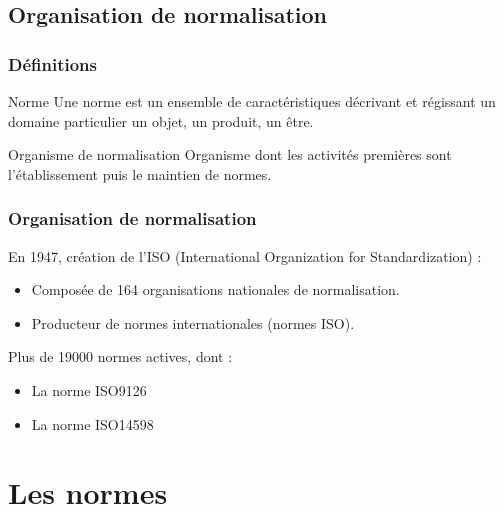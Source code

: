 \documentclass[10pt]{beamer}
\begin{document}
\subsection{Organisation de normalisation}
\begin{frame}
\frametitle{Définitions}
\pause[2] \begin{block}{Norme}
	Une norme est un ensemble de caractéristiques décrivant et régissant un domaine particulier un objet, un produit, un être.
\end{block}

\bigskip

\pause[3] \begin{block}{Organisme de normalisation}
	Organisme dont les activités premières sont l'établissement puis le maintien de normes.
\end{block}

\end{frame}

\begin{frame}
\frametitle{Organisation de normalisation}
\pause[2] En 1947, création de l'ISO (International Organization for Standardization) :
   \begin{itemize}
	\item<3-> Composée de 164 organisations nationales de normalisation.
	\item<4-> Producteur de normes internationales (normes ISO).
    \end{itemize}

\bigskip

\pause[5] Plus de 19000 normes actives, dont :
   \begin{itemize}
	\item<6-> La norme ISO9126
	\item<7-> La norme ISO14598
    \end{itemize}
\end{frame}



\section{Les normes}

\end{document}
